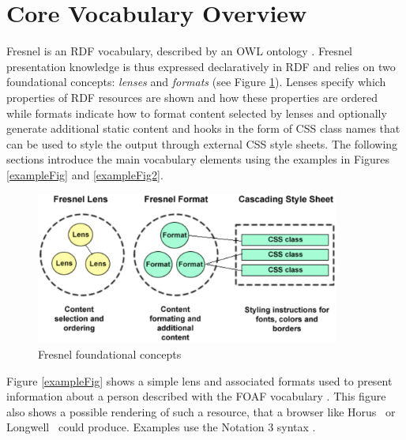 \section{Core Vocabulary Overview}
\label{fresnelov}

Fresnel is an RDF vocabulary, described by an OWL ontology \cite{fresnel05}. Fresnel presentation knowledge is thus expressed declaratively in RDF and relies on two foundational concepts: {\em lenses} and {\em formats} (see Figure \ref{foundationalConceptsFig}). Lenses specify which properties of RDF resources are shown and how these properties are ordered while formats indicate how to format content selected by lenses and optionally generate additional static content and hooks in the form of CSS class names that can be used to style the output through external CSS style sheets. The following sections introduce the main vocabulary elements using the examples in Figures \ref{exampleFig} and \ref{exampleFig2}.

\begin{figure}
\begin{center}
\includegraphics[width=10cm]{overview.pdf}
\caption{Fresnel foundational concepts}
\label{foundationalConceptsFig}
\end{center}
\end{figure}

Figure \ref{exampleFig} shows a simple lens and associated formats used to present information about a person described with the FOAF vocabulary \cite{foaf}. This figure also shows a possible rendering of such a resource, that a browser like Horus~\cite{horus} or Longwell~\cite{simile} could produce. Examples use the Notation 3 syntax \cite{N3}.


